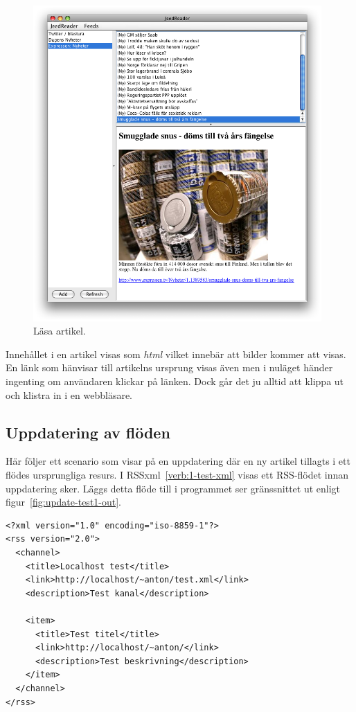 \documentclass[titlepage, twoside, a4paper, 12pt]{article}
\begin{document}
\begin{figure}[!hbp]
  \begin{center}
    \includegraphics[width=110mm]{images/read-item-out.png}
    \caption{Läsa artikel.}
    \label{fig:read-item-out}
  \end{center}
\end{figure}

Innehållet i en artikel visas som \textit{html} vilket innebär att
bilder kommer att visas. En länk som hänvisar till artikelns ursprung
visas även men i nuläget händer ingenting om användaren klickar på
länken. Dock går det ju alltid att klippa ut och klistra in i en
webbläsare.

\subsection{Uppdatering av flöden}
Här följer ett scenario som visar på en uppdatering där en ny artikel
tillagts i ett flödes ursprungliga resurs. I
RSSxml~\ref{verb:1-test-xml} visas ett RSS-flödet innan uppdatering
sker. Läggs detta flöde till i programmet ser gränssnittet ut enligt
figur~\ref{fig:update-test1-out}.

\begin{program}
\begin{footnotesize}
\begin{verbatim}
<?xml version="1.0" encoding="iso-8859-1"?>
<rss version="2.0">
  <channel>
    <title>Localhost test</title>
    <link>http://localhost/~anton/test.xml</link>
    <description>Test kanal</description>

    <item>
      <title>Test titel</title>
      <link>http://localhost/~anton/</link>
      <description>Test beskrivning</description>
    </item>
  </channel>
</rss>
\end{verbatim}
\end{footnotesize}
\caption{Flöde innan uppdatering.}
\label{verb:1-test-xml}
\end{program}
\end{document}
